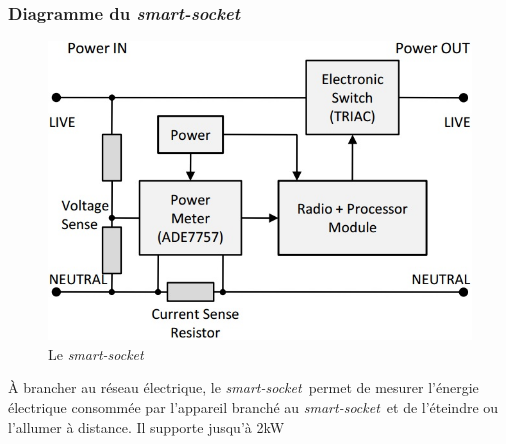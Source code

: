 \newcommand{\smartsocket}{\textit{smart-socket}~}
\begin{frame}
 \frametitle{Diagramme du \smartsocket}
 \begin{figure}
  \centering
  \includegraphics[scale=0.35]{figures/smartsocket.jpg}
  \caption{Le \smartsocket}
 \end{figure} 
 À brancher au réseau électrique, le \smartsocket permet de mesurer l'énergie électrique consommée par l'appareil branché au \smartsocket et de l'éteindre ou l'allumer à distance.
 Il supporte jusqu'à 2kW\\
\end{frame}

